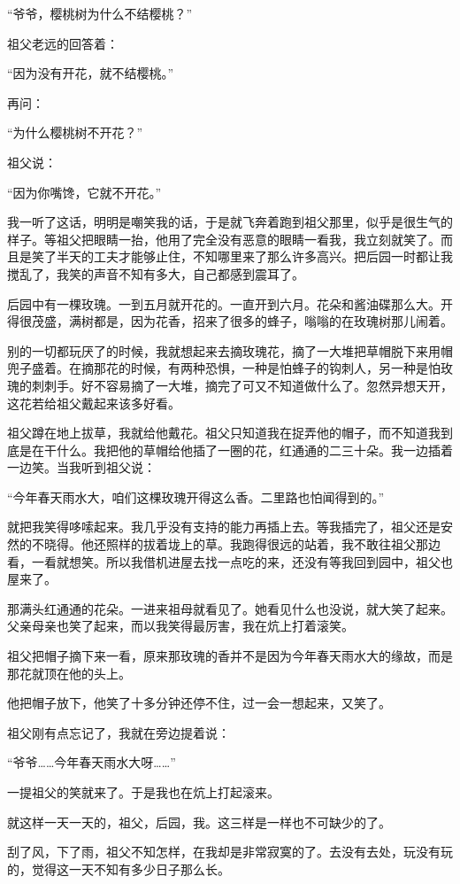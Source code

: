 \par “爷爷，樱桃树为什么不结樱桃？”
\par 祖父老远的回答着：
\par “因为没有开花，就不结樱桃。”
\par 再问：
\par “为什么樱桃树不开花？”
\par 祖父说：
\par “因为你嘴馋，它就不开花。”
\par 我一听了这话，明明是嘲笑我的话，于是就飞奔着跑到祖父那里，似乎是很生气的样子。等祖父把眼睛一抬，他用了完全没有恶意的眼睛一看我，我立刻就笑了。而且是笑了半天的工夫才能够止住，不知哪里来了那么许多高兴。把后园一时都让我搅乱了，我笑的声音不知有多大，自己都感到震耳了。
\par 后园中有一棵玫瑰。一到五月就开花的。一直开到六月。花朵和酱油碟那么大。开得很茂盛，满树都是，因为花香，招来了很多的蜂子，嗡嗡的在玫瑰树那儿闹着。
\par 别的一切都玩厌了的时候，我就想起来去摘玫瑰花，摘了一大堆把草帽脱下来用帽兜子盛着。在摘那花的时候，有两种恐惧，一种是怕蜂子的钩刺人，另一种是怕玫瑰的刺刺手。好不容易摘了一大堆，摘完了可又不知道做什么了。忽然异想天开，这花若给祖父戴起来该多好看。
\par 祖父蹲在地上拔草，我就给他戴花。祖父只知道我在捉弄他的帽子，而不知道我到底是在干什么。我把他的草帽给他插了一圈的花，红通通的二三十朵。我一边插着一边笑。当我听到祖父说：
\par “今年春天雨水大，咱们这棵玫瑰开得这么香。二里路也怕闻得到的。”
\par 就把我笑得哆嗦起来。我几乎没有支持的能力再插上去。等我插完了，祖父还是安然的不晓得。他还照样的拔着垅上的草。我跑得很远的站着，我不敢往祖父那边看，一看就想笑。所以我借机进屋去找一点吃的来，还没有等我回到园中，祖父也屋来了。
\par 那满头红通通的花朵。一进来祖母就看见了。她看见什么也没说，就大笑了起来。父亲母亲也笑了起来，而以我笑得最厉害，我在炕上打着滚笑。
\par 祖父把帽子摘下来一看，原来那玫瑰的香并不是因为今年春天雨水大的缘故，而是那花就顶在他的头上。
\par 他把帽子放下，他笑了十多分钟还停不住，过一会一想起来，又笑了。
\par 祖父刚有点忘记了，我就在旁边提着说：
\par “爷爷……今年春天雨水大呀……”
\par 一提祖父的笑就来了。于是我也在炕上打起滚来。
\par 就这样一天一天的，祖父，后园，我。这三样是一样也不可缺少的了。
\par 刮了风，下了雨，祖父不知怎样，在我却是非常寂寞的了。去没有去处，玩没有玩的，觉得这一天不知有多少日子那么长。
